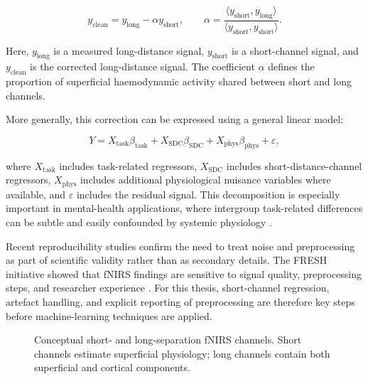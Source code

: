 \begin{equation}
y_{\text{clean}} = y_{\text{long}} - \alpha y_{\text{short}},
\qquad
\alpha =
\frac{\langle y_{\text{short}}, y_{\text{long}} \rangle}
{\langle y_{\text{short}}, y_{\text{short}} \rangle}.
\end{equation}

Here, \(y_{\text{long}}\) is a measured long-distance signal, \(y_{\text{short}}\) is a
short-channel signal, and \(y_{\text{clean}}\) is the corrected long-distance signal. The
coefficient \(\alpha\) defines the proportion of superficial haemodynamic activity shared between
short and long channels.

More generally, this correction can be expressed using a general linear model:

\begin{equation}
Y = X_{\text{task}}\beta_{\text{task}} +
X_{\text{SDC}}\beta_{\text{SDC}} +
X_{\text{phys}}\beta_{\text{phys}} + \varepsilon,
\end{equation}

where \(X_{\text{task}}\) includes task-related regressors, \(X_{\text{SDC}}\) includes
short-distance-channel regressors, \(X_{\text{phys}}\) includes additional physiological nuisance
variables where available, and \(\varepsilon\) includes the residual signal. This decomposition is
especially important in mental-health applications, where intergroup task-related differences can be
subtle and easily confounded by systemic physiology \cite{Scholkmann2022,Yucel2025,Klein2024}.

Recent reproducibility studies confirm the need to treat noise and preprocessing as part of
scientific validity rather than as secondary details. The FRESH initiative showed that fNIRS
findings are sensitive to signal quality, preprocessing steps, and researcher experience
\cite{Yucel2025}. For this thesis, short-channel regression, artefact handling, and explicit
reporting of preprocessing are therefore key steps before machine-learning techniques are applied.

\begin{figure}[h]
\centering
{}
\caption{Conceptual short- and long-separation fNIRS channels. Short channels estimate superficial physiology; long channels contain both superficial and cortical components.}
\label{fig:short_long_channels}
\end{figure}

